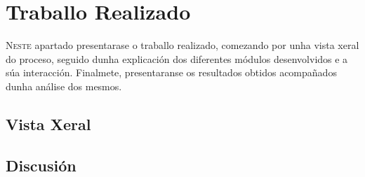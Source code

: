 \chapter{Traballo Realizado}
\label{chap:Traballo Realizado}

\lettrine{N}{este} apartado presentarase o traballo realizado, comezando por unha vista xeral do proceso, 
seguido dunha explicación dos diferentes módulos desenvolvidos e a súa interacción.
Finalmete, presentaranse os resultados obtidos acompañados dunha análise dos mesmos.
\section{Vista Xeral}
\label{sec:Vista Xeral}


\section{Discusión}
\label{sec:Discusión}